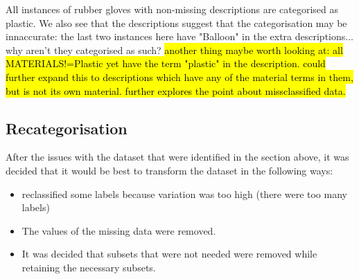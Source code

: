 \documentclass[10pt]{article}\usepackage[]{graphicx}\usepackage[]{color}
\begin{document}
All instances of rubber gloves with non-missing descriptions are categorised as plastic. We also see that the descriptions suggest that the categorisation may be innaccurate: the last two instances here have "Balloon" in the extra descriptions... why aren't they categorised as such?
\hl{another thing maybe worth looking at: all MATERIALS!=Plastic yet have the term "plastic" in the description. could further expand this to descriptions which have any of the material terms in them, but is not its own material. further explores the point about missclassified data.}





\subsection{Recategorisation}


After the issues with the dataset that were identified in the section above, it was decided that it would be best to transform the dataset in the following ways:
\begin{itemize}
\item reclassified some labels because variation was too high (there were too many labels)
\item The values of the missing data were removed.
\item It was decided that subsets that were not needed were removed while retaining the necessary subsets.
\end{itemize}
\end{document}
